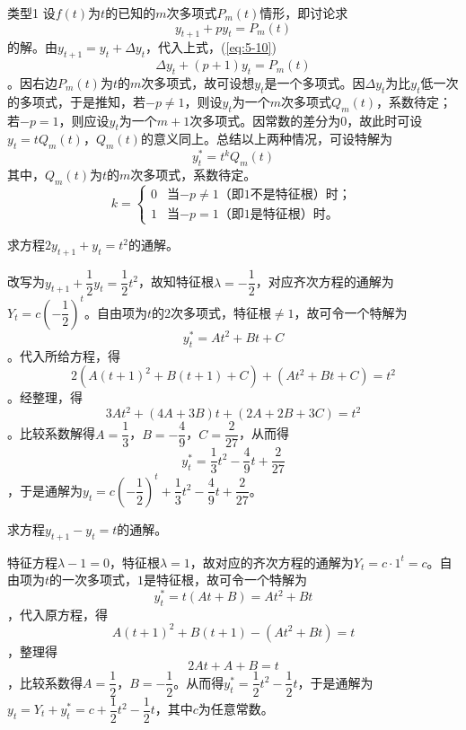 		{\heiti 类型1} \quad 设$f(t)$为$t$的已知的$m$次多项式$P_m(t)$情形，即讨论求
		\begin{equation}\label{eq:5-10}
			y_{t+1} + py_t = P_m(t)
		\end{equation}
		的解。由$y_{t+1} = y_t + \Delta y_t$，代入上式，(\ref{eq:5-10})$$\Delta y_t + (p + 1) y_t = P_m(t)$$。因右边$P_m(t)$为$t$的$m$次多项式，故可设想$y_t$是一个多项式。因$\Delta y_t$为比$y_t$低一次的多项式，于是推知，若$-p \neq 1$，则设$y_t$为一个$m$次多项式$Q_m(t)$，系数待定；若$-p = 1$，则应设$y_t$为一个$m + 1$次多项式。因常数的差分为$0$，故此时可设$y_t = tQ_m(t)$，$Q_m(t)$的意义同上。总结以上两种情况，可设特解为
		\begin{equation}\label{eq:5-11}
			y^*_t = t^kQ_m(t)
		\end{equation}
		其中，$Q_m(t)$为$t$的$m$次多项式，系数待定。
		\begin{displaymath}
			k = 
			\begin{cases}
				0 & \text{当$-p \neq 1$（即$1$不是特征根）时；} \\
				1 & \text{当$-p = 1$（即$1$是特征根）时。}
			\end{cases}
		\end{displaymath}

		\example 求方程$2y_{t + 1} + y_t = t^2$的通解。

		\answer 改写为$y_{t + 1} + \dfrac{1}{2} y_t = \dfrac{1}{2} t^2$，故知特征根$\lambda = -\dfrac{1}{2}$，对应齐次方程的通解为$Y_t = c\left(-\dfrac{1}{2}\right)^t$。自由项为$t$的$2$次多项式，特征根$\neq 1$，故可令一个特解为$$y^*_t = At^2 + Bt + C$$。代入所给方程，得$$2\left(A(t + 1)^2 + B(t + 1) + C\right) + (At^2 + Bt + C) = t^2$$。经整理，得$$3At^2 + (4A + 3B)t + (2A + 2B + 3C) = t^2$$。比较系数解得$A=\dfrac{1}{3}$，$B=-\dfrac{4}{9}$，$C=\dfrac{2}{27}$，从而得$$y^*_t = \dfrac{1}{3}t^2 - \dfrac{4}{9}t + \dfrac{2}{27}$$，于是通解为$y_t = c \left(-\dfrac{1}{2}\right)^t + \dfrac{1}{3}t^2 - \dfrac{4}{9}t + \dfrac{2}{27}$。

		\example 求方程$y_{t+1} - y_t =t$的通解。

		\answer 特征方程$\lambda - 1 = 0$，特征根$\lambda = 1$，故对应的齐次方程的通解为$Y_t = c \cdot 1^t = c$。自由项为$t$的一次多项式，$1$是特征根，故可令一个特解为$$y^*_t = t(At + B) = At^2 + Bt$$，代入原方程，得$$A(t+1)^2 + B(t+1) - (At^2 + Bt) = t$$，整理得$$2At + A + B = t$$，比较系数得$A=\dfrac{1}{2}$，$B=-\dfrac{1}{2}$。从而得$y^*_t = \dfrac{1}{2}t^2 - \dfrac{1}{2}t$，于是通解为$y_t = Y_t + y^*_t = c + \dfrac{1}{2} t^2 - \dfrac{1}{2} t$，其中$c$为任意常数。

